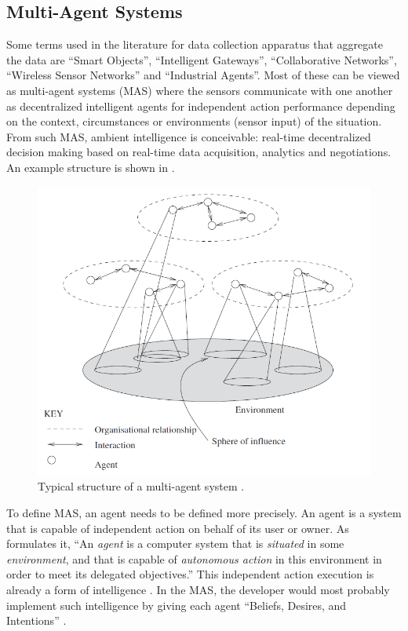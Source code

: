 
\subsection{Multi-Agent Systems}

Some terms used in the literature for data collection apparatus that aggregate the data are ``Smart Objects'', ``Intelligent Gateways'', ``Collaborative Networks'', ``Wireless Sensor Networks'' and ``Industrial Agents''. Most of these can be viewed as multi-agent systems (MAS) where the sensors communicate with one another as decentralized intelligent agents for independent action performance depending on the context, circumstances or environments (sensor input) of the situation. From such MAS, ambient intelligence  is conceivable: real-time decentralized decision making based on real-time data acquisition, analytics and negotiations. An example structure is shown in .

\begin{figure}[h]
	\centering
	\includegraphics[width=0.7\linewidth]{./img/MAS_example}
	\caption{Typical structure of a multi-agent system \citep{wooldridge2009introduction}.}
	\label{fig:MAS_example}
\end{figure}

To define MAS, an agent needs to be defined more precisely. An agent is a system that is capable of independent action on behalf of its user or owner. As  \citet{wooldridge2009introduction} formulates it, ``An \textit{agent} is a computer system that is \textit{situated} in some \textit{environment}, and that is capable of \textit{autonomous action} in this environment in order to meet its delegated objectives.'' This independent action execution is already a form of intelligence \citep{wooldridge2009introduction}. In the MAS, the developer would most probably implement such intelligence by giving each agent ``Beliefs, Desires, and Intentions'' \citep{rao1995bdi}.  

